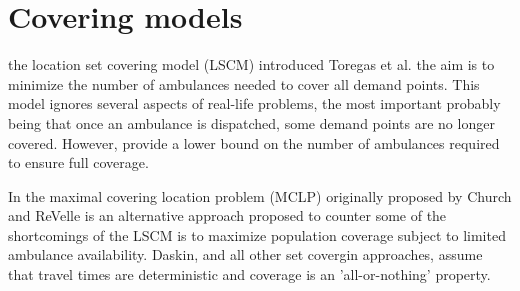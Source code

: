 \section{Covering models}
the location set covering model (LSCM)
introduced Toregas et al. \cite{toregas1971location}
the aim
is to minimize
the number of ambulances needed
to cover all demand points.
This model
ignores several aspects of real-life problems,
the most important
probably being that
once an ambulance is dispatched,
some demand points
are no longer covered.
However,
provide
a lower bound
on the number of ambulances
required to ensure full coverage.

In the maximal covering location problem (MCLP)
originally proposed by Church and ReVelle \cite{church1974maximal}
is an alternative approach
proposed to counter some of the shortcomings of the LSCM
is to maximize population coverage
subject to limited ambulance availability.
Daskin,
and all other set covergin approaches,
assume that
travel times are deterministic
and coverage is an 'all-or-nothing' property.
